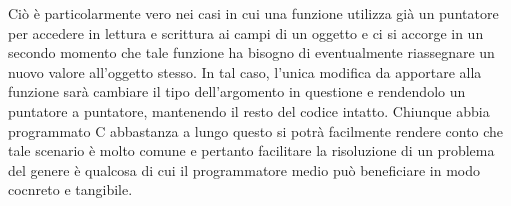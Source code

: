 Ciò è particolarmente vero nei casi in cui una funzione utilizza già un puntatore per accedere 
in lettura e scrittura ai campi di un oggetto e ci si accorge in un secondo momento che tale funzione 
ha bisogno di eventualmente riassegnare un nuovo valore all’oggetto stesso. In tal caso, l’unica modifica 
da apportare alla funzione sarà cambiare il tipo dell’argomento in questione e rendendolo un puntatore 
a puntatore, mantenendo il resto del codice intatto. Chiunque abbia programmato C abbastanza a 
lungo questo si potrà facilmente rendere conto che tale scenario è molto comune e pertanto facilitare 
la risoluzione di un problema del genere è qualcosa di cui il programmatore 
medio può beneficiare in modo cocnreto e tangibile. \\